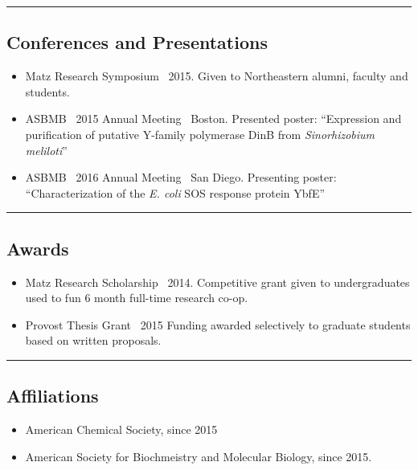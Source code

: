 \documentclass[10pt,letterpaper]{article}
\begin{document}
\hrule
\vspace{-0.4em}
\subsection*{Conferences and Presentations}

\begin{itemize}
  \parskip=0.1em

\item Matz Research Symposium \textbullet \ 2015. Given to Northeastern
  alumni, faculty and students.
\item ASBMB \textbullet \ 2015 Annual Meeting \textbullet \ Boston.
  Presented poster: ``Expression and purification of
  putative Y-family polymerase DinB from \emph{Sinorhizobium meliloti}''
\item ASBMB \textbullet \ 2016 Annual Meeting \textbullet \ San Diego.
  Presenting poster: ``Characterization of the \emph{E. coli} SOS
  response protein YbfE''

\end{itemize}

\hrule
\vspace{-0.4em}
\subsection*{Awards}

\begin{itemize}
  \parskip=0.1em

\item Matz Research Scholarship \textbullet \ 2014. Competitive grant
  given to undergraduates used to fun 6 month full-time research co-op.
\item Provost Thesis Grant \textbullet \ 2015 Funding awarded
  selectively to graduate students based on written proposals.

\end{itemize}

\hrule
\vspace{-0.4em}
\subsection*{Affiliations}

\begin{itemize}
  \parskip=0.1em

\item American Chemical Society, since 2015
\item American Society for Biochmeistry and Molecular Biology, since
  2015.

\end{itemize}
\end{document}
